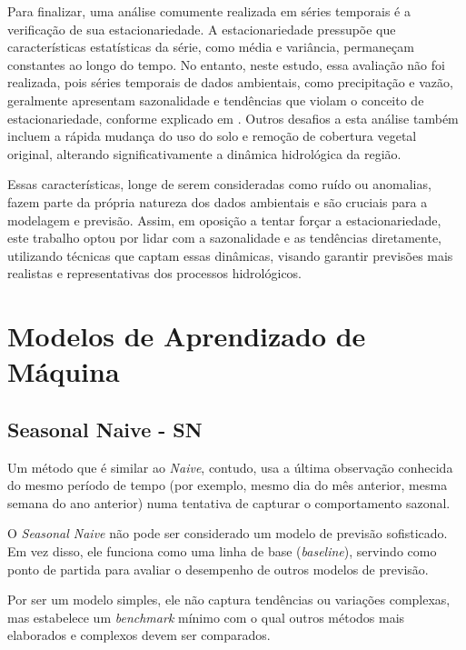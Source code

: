 Para finalizar, uma análise comumente realizada em séries temporais é a verificação de sua estacionariedade. A estacionariedade pressupõe que características estatísticas da série, como média e variância, permaneçam constantes ao longo do tempo. No entanto, neste estudo, essa avaliação não foi realizada, pois séries temporais de dados ambientais, como precipitação e vazão, geralmente apresentam sazonalidade e tendências que violam o conceito de estacionariedade, conforme explicado em \citet{hyndman_fpp3_2024e}. Outros desafios a esta análise também incluem a rápida mudança do uso do solo e remoção de cobertura vegetal original, alterando significativamente a dinâmica hidrológica da região.\cite{rayyan-33388453}

Essas características, longe de serem consideradas como ruído ou anomalias, fazem parte da própria natureza dos dados ambientais e são cruciais para a modelagem e previsão. Assim, em oposição a tentar forçar a estacionariedade, este trabalho optou por lidar com a sazonalidade e as tendências diretamente, utilizando técnicas que captam essas dinâmicas, visando garantir previsões mais realistas e representativas dos processos hidrológicos.

\section{Modelos de Aprendizado de Máquina}

\subsection{Seasonal Naive - SN}

Um método que é similar ao \textit{Naive}, contudo, usa a última observação conhecida do mesmo período de tempo (por exemplo, mesmo dia do mês anterior, mesma semana do ano anterior) numa tentativa de capturar o comportamento sazonal.

O \textit{Seasonal Naive} não pode ser considerado um modelo de previsão sofisticado. Em vez disso, ele funciona como uma linha de base (\textit{baseline}), servindo como ponto de partida para avaliar o desempenho de outros modelos de previsão.\cite{hyndman_fpp3_2024d}

Por ser um modelo simples, ele não captura tendências ou variações complexas, mas estabelece um \textit{benchmark} mínimo com o qual outros métodos mais elaborados e complexos devem ser comparados.

